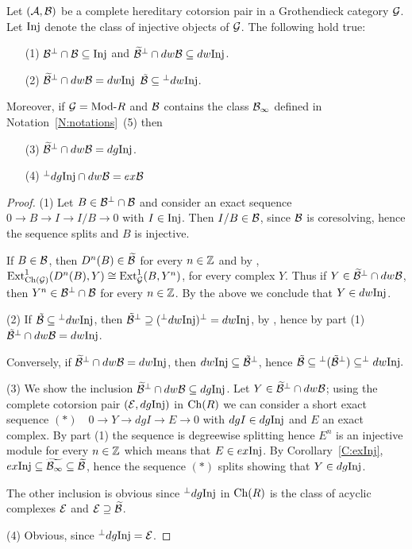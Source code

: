   \begin{lem}\label{L:Cot-inj} Let $(\mathcal{A},\mathcal{B})$ be a complete hereditary cotorsion pair in a Grothendieck category $\mathcal{G}$.
Let $\mathrm{Inj}$ denote the class of injective objects of $\mathcal{G}$. The following hold true:
\begin{enumerate}
\item[(1)] $\mathcal{B}{}^\perp{}\cap \mathcal{B}\subseteq \mathrm{Inj}$ and $\widetilde{\mathcal{B}}{}^\perp{}\cap dw \mathcal{B}\subseteq dw \mathrm{Inj}$.
\item[(2)]  $\widetilde{\mathcal{B}}{}^\perp{}\cap dw \mathcal{B}=dw \mathrm{Inj}$ \iff $\tilde{\mathcal{B}}\subseteq {}^\perp{} dw\mathrm{Inj}$.
\end{enumerate}
Moreover, if $\mathcal{G}=\mathrm{Mod}\textrm{-}{R}$ and $\mathcal{B}$ contains the class $ \mathcal{B}_{\infty}$ defined in Notation~\ref{N:notations}~(5) then
\begin{enumerate}
  \item[(3)]\label{L:Cot-inj.3} $\widetilde{\mathcal{B}}{}^\perp{}\cap dw \mathcal{B}=dg \mathrm{Inj}$.
\item[(4)]\label{L:Cot-inj.4} ${}^\perp{} dg\mathrm{Inj}\cap dw\mathcal{B}=ex \mathcal{B}$
\end{enumerate}

%
%
%
%
%

%
\end{lem}
%
\begin{proof}
(1) Let $B\in \mathcal{B}{}^\perp{}\cap \mathcal{B}$ and consider an exact sequence $0\to B\to I\to I/B\to 0$ with $I\in \mathrm{Inj}$. Then $I/B\in \mathcal{B}$, since $\mathcal{B}$ is coresolving, hence the sequence splits and $B$ is injective.

If $B\in \mathcal{B}$, then $D^n(B)\in \widetilde{\mathcal{B}}$ for every $n\in \mathbb{Z}$ and by \cite[Lemma 3.1]{G3}, $\operatorname{Ext}^1_{\mathrm{Ch}(\mathcal{G})}(D^n(B), Y)\cong \operatorname{Ext}^1_{\mathcal{G}}(B, Y^n)$, for every complex $Y$. Thus if $Y\in \widetilde{\mathcal{B}}{}^\perp{}\cap dw \mathcal{B}$, then $Y^n\in \mathcal{B}{}^\perp{}\cap\mathcal{B}$ for every $n\in \mathbb{Z}$. By the above we conclude that $Y\in dw \mathrm{Inj}$.

(2) If $\tilde{\mathcal{B}}\subseteq {}^\perp{} dw\mathrm{Inj}$, then $\tilde{\mathcal{B}}{}^\perp{}\supseteq  ({}^\perp{} dw\mathrm{Inj}){}^\perp{}=dw\mathrm{Inj}$, by \cite[Proposition 4.4]{G4}, hence by part (1) $\tilde{\mathcal{B}}{}^\perp{}\cap dw \mathcal{B}=dw \mathrm{Inj}$.

Conversely, if $\widetilde{\mathcal{B}}{}^\perp{}\cap dw \mathcal{B}=dw \mathrm{Inj}$, then $dw\mathrm{Inj}\subseteq \tilde{\mathcal{B}}^\perp$, hence $\tilde{\mathcal{B}}\subseteq {}^\perp{}(\tilde{\mathcal{B}}{}^\perp{})\subseteq ^\perp{}dw\mathrm{Inj}.$

(3) We show the inclusion $\widetilde{\mathcal{B}}{}^\perp{}\cap dw \mathcal{B}\subseteq dg \mathrm{Inj}$. Let $Y\in \widetilde{ \mathcal{B}}{}^\perp{}\cap dw \mathcal{B}$; using the complete cotorsion pair $(\mathcal{E}, dg \mathrm{Inj})$ in $\mathrm{Ch}(R)$ we can consider a  short exact sequence $(\ast)\quad 0\to Y\to dg I\to E\to 0$ with $dg I\in dg \mathrm{Inj}$ and $E$ an exact complex. By part (1) the sequence is degreewise splitting hence $E^n$ is an injective module for every $n\in \mathbb{Z}$ which means that $E\in ex \mathrm{Inj}$.
 By  Corollary~\ref{C:exInj}, $ex \mathrm{Inj}\subseteq \widetilde{ \mathcal{B}_{\infty}}\subseteq\widetilde{ \mathcal{B}}$, hence the sequence $(\ast)$ splits showing that $Y\in dg \mathrm{Inj}$.

 The other inclusion is  obvious since  ${}^\perp{} dg \mathrm{Inj}$ in $\mathrm{Ch}(R)$ is the class of acyclic complexes $\mathcal{E}$ and $\mathcal{E}\supseteq \widetilde{ \mathcal{B}}$.

 (4) Obvious, since ${}^\perp{} dg \mathrm{Inj}=\mathcal{E}$.  \end{proof}
